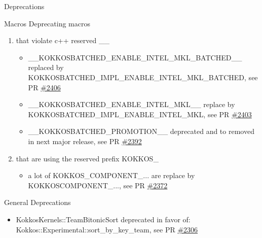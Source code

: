
\begin{frame}[fragile]

  {\Huge Deprecations}

  \vspace{10pt}

\end{frame}

\begin{frame}[fragile]{Macros}
  Deprecating macros
  \begin{enumerate}
  \item that violate c++ reserved \_\_
    \begin{itemize}
    \item \_\_KOKKOSBATCHED\_ENABLE\_INTEL\_MKL\_BATCHED\_\_ replaced by KOKKOSBATCHED\_IMPL\_ENABLE\_INTEL\_MKL\_BATCHED, see PR \href{https://github.com/kokkos/kokkos-kernels/pull/2406}{\#2406}
    \item \_\_KOKKOSBATCHED\_ENABLE\_INTEL\_MKL\_\_ replace by KOKKOSBATCHED\_IMPL\_ENABLE\_INTEL\_MKL, see PR \href{https://github.com/kokkos/kokkos-kernels/pull/2403}{\#2403}
    \item \_\_KOKKOSBATCHED\_PROMOTION\_\_ deprecated and to removed in next major release, see PR \href{https://github.com/kokkos/kokkos-kernels/pull/2392}{\#2392}
    \end{itemize}
  \item that are using the reserved prefix KOKKOS\_
    \begin{itemize}
    \item a lot of {\ttfamily KOKKOS\_COMPONENT\_...} are replace by {\ttfamily KOKKOSCOMPONENT\_...}, see PR \href{https://github.com/kokkos/kokkos-kernels/pull/2372}{\#2372}
    \end{itemize}
  \end{enumerate}
\end{frame}

\begin{frame}[fragile]{General Deprecations}
  \begin{itemize}
  \item {\ttfamily KokkosKernels::TeamBitonicSort} deprecated in favor of: {\ttfamily Kokkos::Experimental::sort\_by\_key\_team}, see PR \href{https://github.com/kokkos/kokkos-kernels/pull/2306}{\#2306}
  \end{itemize}
\end{frame}


